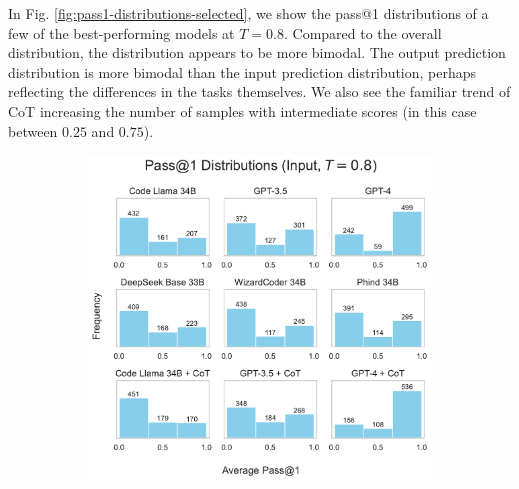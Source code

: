 In Fig. \ref{fig:pass1-distributions-selected}, we show the pass@1 distributions of a few of the best-performing models at $T=0.8$. Compared to the overall distribution, the distribution appears to be more bimodal. The output prediction distribution is more bimodal than the input prediction distribution, perhaps reflecting the differences in the tasks themselves. We also see the familiar trend of CoT increasing the number of samples with intermediate scores (in this case between $0.25$ and $0.75$).

\begin{figure}[h]
    \centering
     \begin{subfigure}[b]{0.49\textwidth}
         \centering
         \includegraphics[width=\textwidth]{figs/diversity/sample_pass1_distributions_input_0.8.pdf}
     \end{subfigure}
     \hfill
     \begin{subfigure}[b]{0.49\textwidth}
         \centering

\end{subfigure}
\end{figure}
